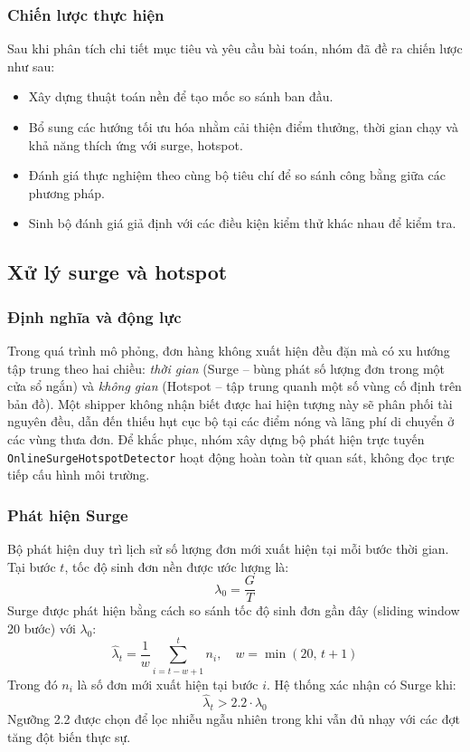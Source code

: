 \documentclass[conference]{IEEEtran}
\begin{document}
\subsubsection{Chiến lược thực hiện}
Sau khi phân tích chi tiết mục tiêu và yêu cầu bài toán, nhóm đã đề ra chiến lược như sau:
\begin{itemize}
    \item Xây dựng thuật toán nền để tạo mốc so sánh ban đầu.
    \item Bổ sung các hướng tối ưu hóa nhằm cải thiện điểm thưởng, thời gian chạy và khả năng thích ứng với surge, hotspot.
    \item Đánh giá thực nghiệm theo cùng bộ tiêu chí để so sánh công bằng giữa các phương pháp.
    \item Sinh bộ đánh giá giả định với các điều kiện kiểm thử khác nhau để kiểm tra.
\end{itemize}

\subsection{Xử lý surge và hotspot}
\label{sec:surge}

\subsubsection{Định nghĩa và động lực}
Trong quá trình mô phỏng, đơn hàng không xuất hiện đều đặn mà có xu hướng tập trung theo hai chiều: \textit{thời gian} (Surge -- bùng phát số lượng đơn trong một cửa sổ ngắn) và \textit{không gian} (Hotspot -- tập trung quanh một số vùng cố định trên bản đồ). Một shipper không nhận biết được hai hiện tượng này sẽ phân phối tài nguyên đều, dẫn đến thiếu hụt cục bộ tại các điểm nóng và lãng phí di chuyển ở các vùng thưa đơn. Để khắc phục, nhóm xây dựng bộ phát hiện trực tuyến \texttt{OnlineSurgeHotspotDetector} hoạt động hoàn toàn từ quan sát, không đọc trực tiếp cấu hình môi trường.
 
\subsubsection{Phát hiện Surge}
Bộ phát hiện duy trì lịch sử số lượng đơn mới xuất hiện tại mỗi bước thời gian. Tại bước $t$, tốc độ sinh đơn nền được ước lượng là:
\begin{equation}
\lambda_0 = \frac{G}{T}
\end{equation}
Surge được phát hiện bằng cách so sánh tốc độ sinh đơn gần đây (sliding window 20 bước) với $\lambda_0$:
\begin{equation}
\hat{\lambda}_t = \frac{1}{w} \sum_{i=t-w+1}^{t} n_i, \quad w = \min(20,\, t+1)
\end{equation}
Trong đó $n_i$ là số đơn mới xuất hiện tại bước $i$. Hệ thống xác nhận có Surge khi:
\begin{equation}
\hat{\lambda}_t > 2.2 \cdot \lambda_0
\end{equation}
Ngưỡng 2.2 được chọn để lọc nhiễu ngẫu nhiên trong khi vẫn đủ nhạy với các đợt tăng đột biến thực sự.
 
\end{document}
